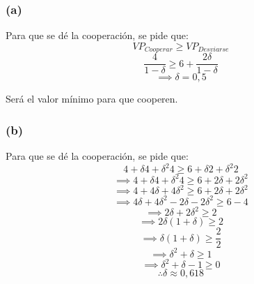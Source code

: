 \documentclass{article}
\begin{document}
            \subsubsection*{(a)}
                Para que se dé la cooperación, se pide que:
                \[VP_{Cooperar} \geq VP_{Desviarse}\]
                \[\frac{4}{1 - \delta} \geq 6 + \frac{2\delta}{1-\delta}\]
                \[\implies \delta = 0,5\]

                Será el valor mínimo para que cooperen.
            \subsubsection*{(b)}
                Para que se dé la cooperación, se pide que:
                \[4 + \delta 4 + \delta^{2}4 \geq 6 + \delta 2 + \delta^{2}2\]
                \[\implies 4 + \delta 4 + \delta^{2}4 \geq 6 + 2\delta + 2\delta^{2}\]
                \[\implies 4 + 4\delta + 4\delta^{2} \geq 6 + 2\delta + 2\delta^{2}\]
                \[\implies 4\delta + 4\delta^{2} - 2\delta - 2\delta^{2} \geq 6 - 4\]
                \[\implies 2\delta + 2\delta^{2} \geq 2\]
                \[\implies 2\delta(1+\delta) \geq 2\]
                \[\implies \delta(1+\delta) \geq \frac{2}{2}\]
                \[\implies \delta^{2}+\delta \geq 1\]
                \[\implies \delta^{2}+\delta - 1 \geq 0\]
                \[\therefore \delta \approx 0,618 \]
                
\end{document}
